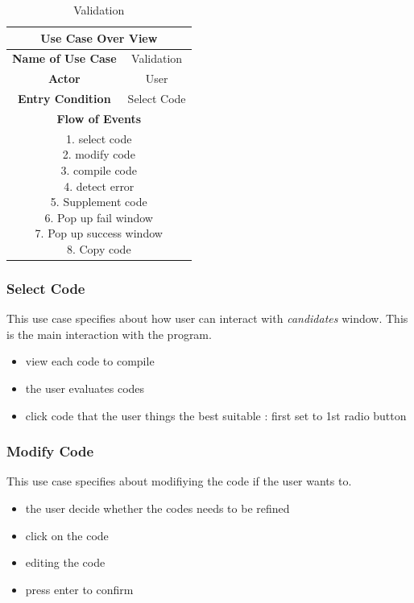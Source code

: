 \documentclass[conference]{IEEEtran}
\begin{document}
\begin{table}[hbt]
\renewcommand{\arraystretch}{1}
\caption{Validation}
\label{table:usecase3}
\centering
\begin{adjustbox}{width=0.4\textwidth}
\small
\begin{tabular}{c|c}
\hline
\multicolumn{2}{c}{\textbf{Use Case Over View}} \\
\hline
\textbf{Name of Use Case} & Validation \\
\hline
\textbf{Actor} & User \\
\hline
\textbf{Entry Condition} & Select Code\\
\hline
\multicolumn{2}{c}{\textbf{Flow of Events}}\\
\hline
\multicolumn{2}{c}{
\parbox[t]{5cm}{
  1. select code \\
  2. modify code \\
  3. compile code \\
  4. detect error \\
  5. Supplement code \\
  6. Pop up fail window \\
  7. Pop up success window \\
  8. Copy code
  }
}\\
\hline

\end{tabular}
\end{adjustbox}
\end{table}



\subsubsection{Select Code}
This use case specifies about how user can interact with \textit{candidates} window. This is the main interaction with the program.
\begin{itemize}
  \item view each code to compile
  \item the user evaluates codes
  \item click code that the user things the best suitable : first set to 1st radio button
\end{itemize}
\textit{}


\subsubsection{Modify Code}
This use case specifies about modifiying the code if the user wants to.
\begin{itemize}
  \item the user decide whether the codes needs to be refined
  \item click on the code
  \item editing the code
  \item press enter to confirm
\end{itemize}
\textit{}
\end{document}

